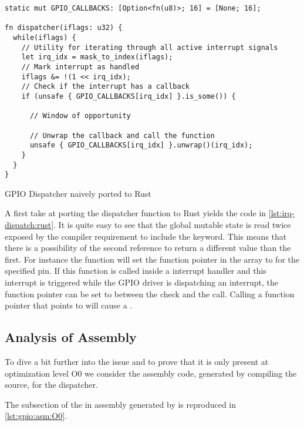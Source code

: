 \begin{listing}
  \begin{verbatim}
static mut GPIO_CALLBACKS: [Option<fn(u8)>; 16] = [None; 16];

fn dispatcher(iflags: u32) {
  while(iflags) {
    // Utility for iterating through all active interrupt signals
    let irq_idx = mask_to_index(iflags);
    // Mark interrupt as handled
    iflags &= !(1 << irq_idx);
    // Check if the interrupt has a callback
    if (unsafe { GPIO_CALLBACKS[irq_idx] }.is_some()) {

      // Window of opportunity

      // Unwrap the callback and call the function
      unsafe { GPIO_CALLBACKS[irq_idx] }.unwrap()(irq_idx);
    }
  }
}
  \end{verbatim}
  \caption{GPIO Dispatcher naively ported to Rust}
  \label{lst:irq-dispatch:rust}
\end{listing}

A first take at porting the dispatcher function to Rust yields the code in \autoref{lst:irq-dispatch:rust}.
It is quite easy to see that the global mutable state is read twice exposed by the compiler requirement to include the {\unsafe} keyword.
This means that there is a possibility of the second reference to return a different value than the first.
For instance the function  will set the function pointer in the array to  for the specified pin.
If this function is called inside a interrupt handler and this interrupt is triggered while the GPIO driver is dispatching an interrupt, the function pointer can be set to  between the check and the call.
Calling a function pointer that points to  will cause a .

\subsection{Analysis of Assembly}
To dive a bit further into the issue and to prove that it is only present at optimization level O0 we consider the assembly code, generated by compiling the {\C} source, for the dispatcher.

The subsection of the  in assembly generated by  is reproduced in \autoref{lst:gpio:asm:O0}.

